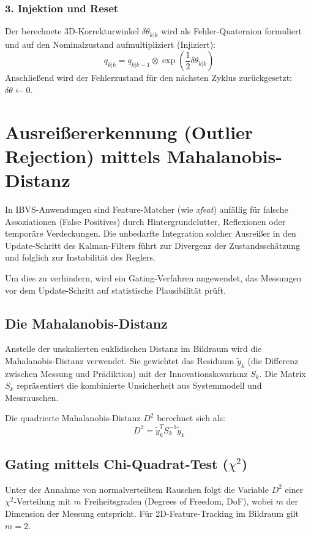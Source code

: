 \documentclass{article}
\begin{document}
\subsubsection{3. Injektion und Reset}
Der berechnete 3D-Korrekturwinkel $\delta \theta_{k|k}$ wird als Fehler-Quaternion formuliert und auf den Nominalzustand aufmultipliziert (Injiziert):
\begin{equation}
    q_{k|k} = q_{k|k-1} \otimes \exp\left(\frac{1}{2} \delta \theta_{k|k}\right)
\end{equation}
Anschließend wird der Fehlerzustand für den nächsten Zyklus zurückgesetzt: $\delta \theta \leftarrow 0$.





\section{Ausreißererkennung (Outlier Rejection) mittels Mahalanobis-Distanz}
\label{sec:outlier_rejection}

In IBVS-Anwendungen sind Feature-Matcher (wie \textit{xfeat}) anfällig für falsche Assoziationen (False Positives) durch Hintergrundclutter, Reflexionen oder temporäre Verdeckungen. Die unbedarfte Integration solcher Ausreißer in den Update-Schritt des Kalman-Filters führt zur Divergenz der Zustandsschätzung und folglich zur Instabilität des Reglers.

Um dies zu verhindern, wird ein Gating-Verfahren angewendet, das Messungen vor dem Update-Schritt auf statistische Plausibilität prüft.




\subsection{Die Mahalanobis-Distanz}
Anstelle der unskalierten euklidischen Distanz im Bildraum wird die Mahalanobis-Distanz verwendet. Sie gewichtet das Residuum $\tilde{y}_k$ (die Differenz zwischen Messung und Prädiktion) mit der Innovationskovarianz $S_k$. Die Matrix $S_k$ repräsentiert die kombinierte Unsicherheit aus Systemmodell und Messrauschen.

Die quadrierte Mahalanobis-Distanz $D^2$ berechnet sich als:
\begin{equation}
    D^2 = \tilde{y}_k^T S_k^{-1} \tilde{y}_k
\end{equation}




\subsection{Gating mittels Chi-Quadrat-Test ($\chi^2$)}
Unter der Annahme von normalverteiltem Rauschen folgt die Variable $D^2$ einer $\chi^2$-Verteilung mit $m$ Freiheitsgraden (Degrees of Freedom, DoF), wobei $m$ der Dimension der Messung entspricht. Für 2D-Feature-Tracking im Bildraum gilt $m = 2$.
\end{document}
